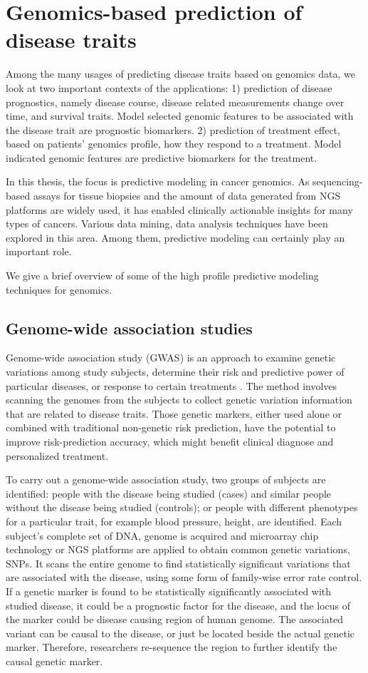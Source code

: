\section{Genomics-based prediction of disease traits}
\label{sec:Prediction}
Among the many usages of predicting disease traits based on genomics data, we look at two important contexts of the applications: 1) prediction of disease prognostics, namely disease course, disease related measurements change over time, and survival traits. Model selected genomic features to be associated with the disease trait are prognostic biomarkers. 2) prediction of treatment effect, based on patients' genomics profile, how they respond to a treatment. Model indicated genomic features are predictive biomarkers for the treatment. 

In this thesis, the focus is predictive modeling in cancer genomics. As sequencing-based assays for tissue biopsies and the amount of data generated from NGS platforms are widely used, it has enabled clinically actionable insights for many types of cancers. Various data mining, data analysis techniques have been explored in this area. Among them, predictive modeling can certainly play an important role.

We give a brief overview of some of the high profile predictive modeling techniques for genomics. 

\subsection{Genome-wide association studies}
Genome-wide association study (GWAS) is an approach to examine genetic variations among study subjects, determine their risk and predictive power of particular diseases, or response to certain treatments \citep{manolio2010genomewide}. The method involves scanning the genomes from the subjects to collect genetic variation information that are related to disease traits. Those genetic markers, either used alone or combined with traditional non-genetic risk prediction, have the potential to improve risk-prediction accuracy, which might beneﬁt clinical diagnose and personalized treatment.

To carry out a genome-wide association study, two groups of subjects are identified: people with the disease being studied (cases) and similar people without the disease being studied (controls); or people with different phenotypes for a particular trait, for example blood pressure, height, are identified. Each subject's complete set of DNA, genome is acquired and microarray chip technology or NGS platforms are applied to obtain common genetic variations, SNPs. It scans the entire genome to find statistically significant variations that are associated with the disease, using some form of family-wise error rate control. If a genetic marker is found to be statistically significantly associated with studied disease, it could be a prognostic factor for the disease, and the locus of the marker could be disease causing region of human genome. The associated variant can be causal to the disease, or just be located beside the actual genetic marker. Therefore, researchers re-sequence the region to further identify the causal genetic marker. 

